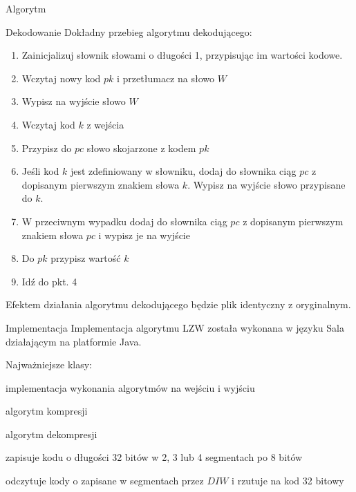 \documentclass{article}
\begin{document}
\begin{section}{Algorytm}
\begin{subsection}{Dekodowanie}
      Dokładny przebieg algorytmu dekodującego:
      \begin{enumerate}
	\item Zainicjalizuj słownik słowami o długości 1, przypisując im wartości kodowe.
	\item Wczytaj nowy kod $pk$ i przetłumacz na słowo $W$
	\item Wypisz na wyjście słowo $W$
	\item Wczytaj kod $k$ z wejścia 
	\item Przypisz do $pc$ słowo skojarzone z kodem $pk$
	\item Jeśli kod $k$ jest zdefiniowany w słowniku, dodaj do słownika ciąg $pc$ z dopisanym pierwszym znakiem słowa $k$. 
	  Wypisz na wyjście słowo przypisane do $k$.
	\item W przeciwnym wypadku dodaj do słownika ciąg $pc$ z dopisanym pierwszym znakiem słowa $pc$ i wypisz je na wyjście
	\item Do $pk$ przypisz wartość $k$
	\item Idź do pkt. 4
      \end{enumerate}
      Efektem działania algorytmu dekodującego będzie plik identyczny z oryginalnym.
    \end{subsection}
  \end{section}
  \begin{section}{Implementacja}
      Implementacja algorytmu LZW została wykonana w języku Sala działającym na platformie Java.

      Najważniejsze klasy:
      \begin{description}[leftmargin=8em,style=nextline]
	\item[LZW] implementacja wykonania algorytmów na wejściu i wyjściu
	\item[MutableCompression] algorytm kompresji
	\item[MutableDecompression] algorytm dekompresji
	\item[DummyIntWriter] zapisuje kodu o długości 32 bitów w 2, 3 lub 4 segmentach po 8 bitów
	\item[DummyIntReader] odczytuje kody o zapisane w segmentach przez $DIW$ i rzutuje na kod 32 bitowy
      \end{description}

  \end{section}
\end{document}
